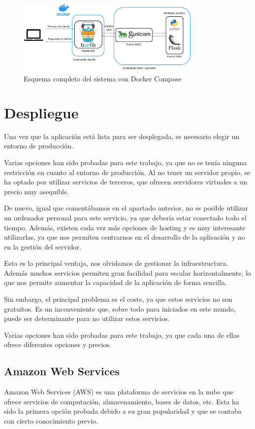 \begin{figure}[htpb]
    \centering
    \includegraphics[width=0.8\textwidth]{cap3/images/arquitectura-docker.png}
    \caption{Esquema completo del sistema con Docker Compose}
    \label{fig:docker-compose}
\end{figure}

\section{Despliegue}
Una vez que la aplicación está lista para ser desplegada, es necesario elegir un entorno de producción.

Varias opciones han sido probadas para este trabajo, ya que no se tenía ninguna restricción en cuanto al entorno de producción.
Al no tener un servidor propio, se ha optado por utilizar servicios de terceros, que ofrecen servidores virtuales a un precio muy asequible.

De nuevo, igual que comentábamos en el apartado anterior, no es posible utilizar un ordenador personal para este servicio, ya que debería estar conectado todo el tiempo.
Además, existen cada vez más opciones de hosting y es muy interesante utilizarlas, ya que nos permiten centrarnos en el desarrollo de la aplicación y no en la gestión del servidor.

Esta es la principal ventaja, nos olvidamos de gestionar la infraestructura.
Además muchos servicios permiten gran facilidad para escalar horizontalmente, lo que nos permite aumentar la capacidad de la aplicación de forma sencilla.

Sin embargo, el principal problema es el coste, ya que estos servicios no son gratuitos.
Es un inconveniente que, sobre todo para iniciados en este mundo, puede ser determinante para no utilizar estos servicios.

Varias opciones han sido probadas para este trabajo, ya que cada una de ellas ofrece diferentes opciones y precios.

\subsection{Amazon Web Services}
Amazon Web Services (AWS) es una plataforma de servicios en la nube que ofrece servicios de computación, almacenamiento, bases de datos, etc.
Esta ha sido la primera opción probada debido a su gran popularidad y que se contaba con cierto conocimiento previo.

